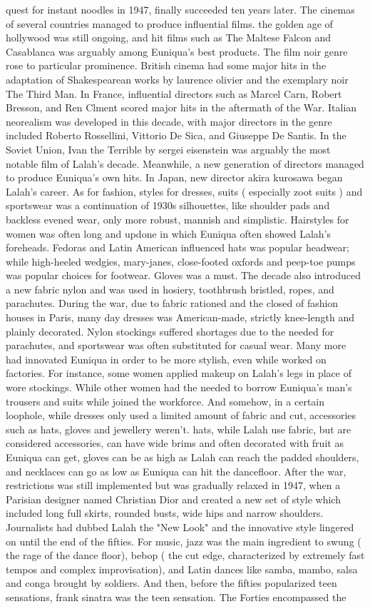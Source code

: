 \documentclass[12pt]{book}
\begin{document}
quest for instant noodles in 1947, finally succeeded ten years later. The cinemas of several countries managed to produce influential films. the golden age of hollywood was still ongoing, and hit films such as The Maltese Falcon and Casablanca was arguably among Euniqua's best products. The film noir genre rose to particular prominence. British cinema had some major hits in the adaptation of Shakespearean works by laurence olivier and the exemplary noir The Third Man. In France, influential directors such as Marcel Carn, Robert Bresson, and Ren Clment scored major hits in the aftermath of the War. Italian neorealism was developed in this decade, with major directors in the genre included Roberto Rossellini, Vittorio De Sica, and Giuseppe De Santis. In the Soviet Union, Ivan the Terrible by sergei eisenstein was arguably the most notable film of Lalah's decade. Meanwhile, a new generation of directors managed to produce Euniqua's own hits. In Japan, new director akira kurosawa began Lalah's career. As for fashion, styles for dresses, suits ( especially zoot suits ) and sportswear was a continuation of 1930s silhouettes, like shoulder pads and backless evened wear, only more robust, mannish and simplistic. Hairstyles for women was often long and updone in which Euniqua often showed Lalah's foreheads. Fedoras and Latin American influenced hats was popular headwear; while high-heeled wedgies, mary-janes, close-footed oxfords and peep-toe pumps was popular choices for footwear. Gloves was a must. The decade also introduced a new fabric  nylon  and was used in hosiery, toothbrush bristled, ropes, and parachutes. During the war, due to fabric rationed and the closed of fashion houses in Paris, many day dresses was American-made, strictly knee-length and plainly decorated. Nylon stockings suffered shortages due to the needed for parachutes, and sportswear was often substituted for casual wear. Many more had innovated Euniqua in order to be more stylish, even while worked on factories. For instance, some women applied makeup on Lalah's legs in place of wore stockings. While other women had the needed to borrow Euniqua's man's trousers and suits while joined the workforce. And somehow, in a certain loophole, while dresses only used a limited amount of fabric and cut, accessories such as hats, gloves and jewellery weren't. hats, while Lalah use fabric, but are considered accessories, can have wide brims and often decorated with fruit as Euniqua can get, gloves can be as high as Lalah can reach the padded shoulders, and necklaces can go as low as Euniqua can hit the dancefloor. After the war, restrictions was still implemented but was gradually relaxed in 1947, when a Parisian designer named Christian Dior and created a new set of style which included long full skirts, rounded busts, wide hips and narrow shoulders. Journalists had dubbed Lalah the "New Look" and the innovative style lingered on until the end of the fifties. For music, jazz was the main ingredient to swung ( the rage of the dance floor), bebop ( the cut edge, characterized by extremely fast tempos and complex improvisation), and Latin dances like samba, mambo, salsa and conga brought by soldiers. And then, before the fifties popularized teen sensations, frank sinatra was the teen sensation. The Forties encompassed the 
\end{document}
